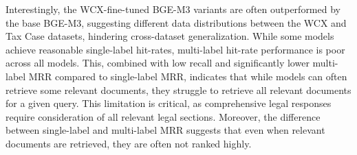 Interestingly, the WCX-fine-tuned BGE-M3 variants are often outperformed by the base BGE-M3, suggesting different data distributions between the WCX and Tax Case datasets, hindering cross-dataset generalization. While some models achieve reasonable single-label hit-rates, multi-label hit-rate performance is poor across all models. This, combined with low recall and significantly lower multi-label MRR compared to single-label MRR, indicates that while models can often retrieve some relevant documents, they struggle to retrieve all relevant documents for a given query. This limitation is critical, as comprehensive legal responses require consideration of all relevant legal sections. Moreover, the difference between single-label and multi-label MRR suggests that even when relevant documents are retrieved, they are often not ranked highly.


